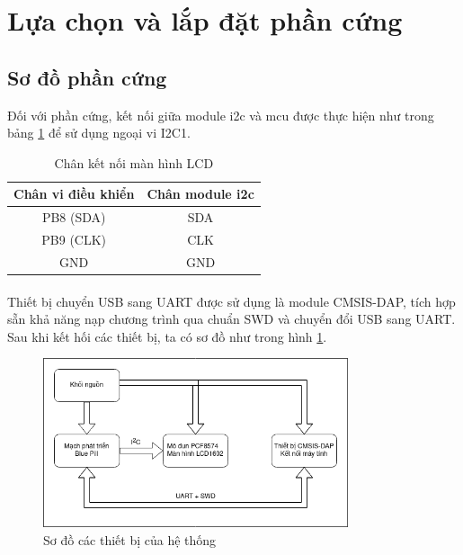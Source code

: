 \section{Lựa chọn và lắp đặt phần cứng}
\subsection{Sơ đồ phần cứng}
Đối với phần cứng, kết nối giữa module \acrshort{i2c} và \acrlong{mcu} được thực hiện như trong bảng \ref{tab:lcd-wiring} để sử dụng ngoại vi I2C1.

\begin{table}[H]
    \centering
    \caption{Chân kết nối màn hình LCD}
    \begin{tabular}{|c|c|}
        \hline
        Chân vi điều khiển & Chân module \acrshort{i2c} \\
        \hline
        PB8 (SDA) & SDA \\
        \hline
        PB9 (CLK) & CLK \\
        \hline
        GND & GND \\
        \hline
    \end{tabular}
    \label{tab:lcd-wiring}
\end{table}

\paragraph{}
Thiết bị chuyển USB sang UART được sử dụng là module CMSIS-DAP, tích hợp sẵn khả năng nạp chương trình qua chuẩn SWD và chuyển đổi USB sang UART. Sau khi kết hối các thiết bị, ta có sơ đồ như trong hình \ref{fig:dev-block}.

\begin{figure}[H]
    \centering
    \includegraphics[width=0.8\textwidth]{images/arm-co-ban-device-block-diagram.drawio.png}
    \caption{Sơ đồ các thiết bị của hệ thống}
    \label{fig:dev-block}
\end{figure}
